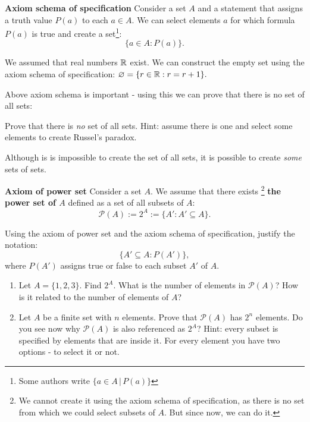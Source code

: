 \begin{definition}
  \textbf{Axiom schema of specification} Consider a set $A$ and a statement that assigns a truth value $P(a)$ to each $a\in A$. We can select elements $a$
  for which formula $P(a)$ is true and create a set\footnote{Some authors write $\{a\in A\,|\,P(a)\}$}:
  $$\{a\in A : P(a)\}.$$
\end{definition}

\begin{example}
  We assumed that real numbers $\mathbb R$ exist. We can construct the empty set using the axiom schema of specification:
  $\varnothing=\{r\in\mathbb R : r=r+1\}.$
\end{example}

Above axiom schema is important - using this we can prove that there is no set of all sets:
\begin{exercise}
  Prove that there is \textit{no} set of all sets. Hint: assume there is one and select some elements to create Russel's paradox.
\end{exercise}

Although is is impossible to create the set of all sets, it is possible to create \textit{some} sets of sets.

\begin{definition}
  \textbf{Axiom of power set} Consider a set $A$. We assume that there exists
  \footnote{We cannot create it using the axiom schema of specification, as there is no set from which we could select subsets of $A$. But since now, we can do it.}
  \textbf{the power set of $A$} defined as a set of all subsets of $A$:
  $$\mathcal P(A) := 2^A := \{A' : A'\subseteq A\}.$$
\end{definition}

\begin{exercise}
  Using the axiom of power set and the axiom schema of specification, justify the notation:
  $$\{A'\subseteq A : P(A')\},$$
  where $P(A')$ assigns true or false to each subset $A'$ of $A$.
\end{exercise}

\begin{exercise}
  \begin{enumerate}
    \item Let $A=\{1,2,3\}$. Find $2^A$. What is the number of elements in $\mathcal P(A)$? How is it related to the
      number of elements of $A$?
    \item Let $A$ be a finite set with $n$ elements. Prove that $\mathcal P(A)$ has $2^n$ elements.
      Do you see now why $\mathcal P(A)$ is also referenced as $2^A$?
      Hint: every subset is specified by elements that are inside it.
      For every element you have two options - to select it or not.
  \end{enumerate}
\end{exercise}

